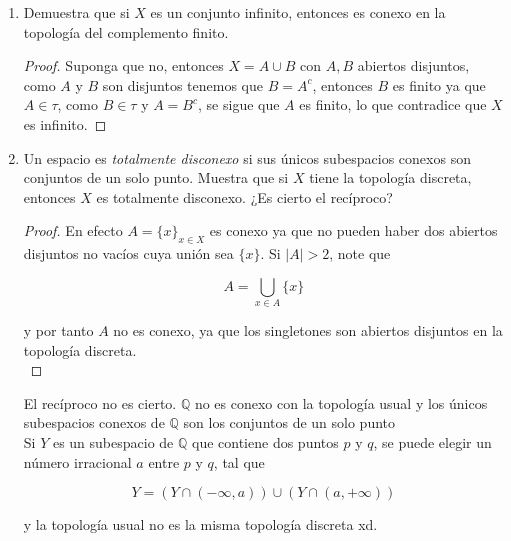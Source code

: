 \documentclass[11pt]{article}
\begin{document}
\begin{enumerate}
    \begin{proof}
        Note que $$A\cup \bigcup_{\alpha}A_{\alpha}=\bigcup_{\alpha}(A\cup A_{\alpha})$$

        y como $A\subset \displaystyle \bigcap_{\alpha}(A\cup A_{\alpha}) 
            $, y $A\neq \emptyset$, entonces por el punto anterior se concluye lo deseado.
    \end{proof}
    
    \item Demuestra que si $X$ es un conjunto infinito, entonces es conexo en la topología del complemento finito.

    \begin{proof}
        Suponga que no, entonces $X=A\cup B$ con $A,B$ abiertos disjuntos, como $A$ y $B$ son disjuntos tenemos que $B=A^{c}$, entonces $B$ es finito ya que $A\in \tau$, como $B\in \tau$ y $A=B^{c}$, se sigue que $A$ es finito, lo que contradice que $X$ es infinito.
    \end{proof}
    
    \item Un espacio es \textit{totalmente disconexo} si sus únicos subespacios conexos son conjuntos de un solo punto. Muestra que si $X$ tiene la topología discreta, entonces $X$ es totalmente disconexo. ¿Es cierto el recíproco?

    \begin{proof}
        En efecto $A=\{x\}_{x\in X}$ es conexo ya que no pueden haber dos abiertos disjuntos no vacíos cuya unión sea $\{x\}$. Si $|A|>2$, note que 

        $$A=\bigcup_{x\in A}\{x\}
            $$

        y por tanto $A$ no es conexo, ya que los singletones son abiertos disjuntos en la topología discreta.\\
    \end{proof}
    
    El recíproco no es cierto. $\mathbb{Q}$ no es conexo con la topología usual y los únicos subespacios conexos de $\mathbb{Q}$ son los conjuntos de un solo punto\\

    Si $Y$ es un subespacio de $\mathbb{Q}$ que contiene dos puntos $p$ y $q$, se puede elegir un número irracional $a$ entre $p$ y $q$, tal que

$$
Y=(Y \cap (-\infty, a)) \cup  (Y \cap (a, +\infty))
$$

y la topología usual  no es la misma topología discreta xd.


\end{enumerate}
\end{document}
